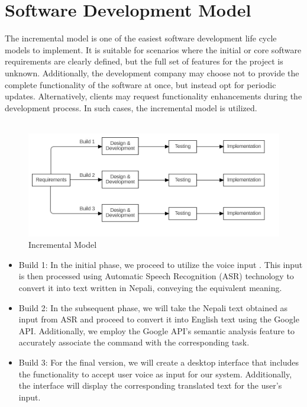 \section{Software Development Model}
The incremental model is one of the easiest software development life cycle models to implement. It is suitable for scenarios where the initial or core software requirements are clearly defined, but the full set of features for the project is unknown. Additionally, the development company may choose not to provide the complete functionality of the software at once, but instead opt for periodic updates. Alternatively, clients may request functionality enhancements during the development process. In such cases, the incremental model is utilized.
\\
\\
\begin{figure}[h]
    \centering
    \includegraphics[scale=0.4]{images/incremental.jpg}
    \caption{Incremental Model}
    \label{fig:my_label}
\end{figure}
\begin{itemize}
\item Build 1: In the initial phase, we proceed to utilize the voice input . This input is then processed using Automatic Speech Recognition (ASR) technology to convert it into text written in Nepali, conveying the equivalent meaning.
\item Build 2: In the subsequent phase, we will take the Nepali text obtained as input from ASR and proceed to convert it into English text using the Google API. Additionally, we employ the Google API's semantic analysis feature to accurately associate the command with the corresponding task.
\item Build 3: For the final version, we will create a desktop interface that includes the functionality to accept user voice as input for our system. Additionally, the interface will display the corresponding translated text for the user's input.
\end{itemize}



